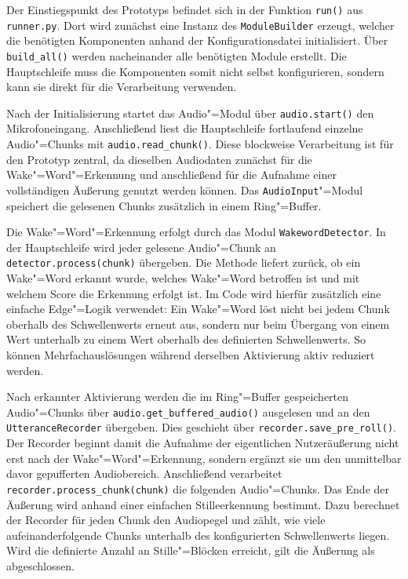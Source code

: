 Der Einstiegspunkt des Prototyps befindet sich in der Funktion \texttt{run()} aus \texttt{runner.py}. Dort wird zunächst eine Instanz des \texttt{ModuleBuilder} erzeugt, welcher die benötigten Komponenten anhand der Konfigurationsdatei initialisiert. Über \texttt{build\_all()} werden nacheinander alle benötigten Module erstellt. Die Hauptschleife muss die Komponenten somit nicht selbst konfigurieren, sondern kann sie direkt für die Verarbeitung verwenden.

Nach der Initialisierung startet das Audio"=Modul über \texttt{audio.start()} den Mikrofoneingang. Anschließend liest die Hauptschleife fortlaufend einzelne Audio"=Chunks mit \texttt{audio.read\_chunk()}. Diese blockweise Verarbeitung ist für den Prototyp zentral, da dieselben Audiodaten zunächst für die Wake"=Word"=Erkennung und anschließend für die Aufnahme einer vollständigen Äußerung genutzt werden können. Das \texttt{AudioInput}"=Modul speichert die gelesenen Chunks zusätzlich in einem Ring"=Buffer.

Die Wake"=Word"=Erkennung erfolgt durch das Modul \texttt{WakewordDetector}. In der Hauptschleife wird jeder gelesene Audio"=Chunk an \texttt{detector.process(chunk)} übergeben. Die Methode liefert zurück, ob ein Wake"=Word erkannt wurde, welches Wake"=Word betroffen ist und mit welchem Score die Erkennung erfolgt ist. Im Code wird hierfür zusätzlich eine einfache Edge"=Logik verwendet: Ein Wake"=Word löst nicht bei jedem Chunk oberhalb des Schwellenwerts erneut aus, sondern nur beim Übergang von einem Wert unterhalb zu einem Wert oberhalb des definierten Schwellenwerts. So können Mehrfachauslösungen während derselben Aktivierung aktiv reduziert werden.

Nach erkannter Aktivierung werden die im Ring"=Buffer gespeicherten Audio"=Chunks über \texttt{audio.get\_buffered\_audio()} ausgelesen und an den \texttt{UtteranceRecorder} übergeben. Dies geschieht über \texttt{recorder.save\_pre\_roll()}. Der Recorder beginnt damit die Aufnahme der eigentlichen Nutzeräußerung nicht erst nach der Wake"=Word"=Erkennung, sondern ergänzt sie um den unmittelbar davor gepufferten Audiobereich. Anschließend verarbeitet \texttt{recorder.process\_chunk(chunk)} die folgenden Audio"=Chunks. Das Ende der Äußerung wird anhand einer einfachen Stilleerkennung bestimmt. Dazu berechnet der Recorder für jeden Chunk den Audiopegel und zählt, wie viele aufeinanderfolgende Chunks unterhalb des konfigurierten Schwellenwerts liegen. Wird die definierte Anzahl an Stille"=Blöcken erreicht, gilt die Äußerung als abgeschlossen.

